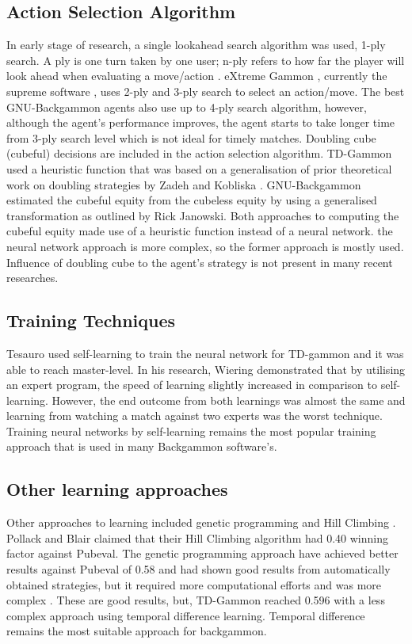\documentclass[12pt,a4paper]{article}
\begin{document}
\subsection{Action Selection Algorithm}
In early stage of research, a single lookahead search algorithm was used, 1-ply search. A ply is one turn taken by one user; n-ply refers to how far the player will look ahead when evaluating a move/action \cite{glossary}. eXtreme Gammon \citeyear{exg}, currently the supreme software \cite{botbattle}, uses 2-ply and 3-ply search to select an action/move. The best GNU-Backgammon \cite{gnubg} agents also use up to 4-ply search algorithm, however, although the agent's performance improves, the agent starts to take longer time from 3-ply search level which is not ideal for timely matches. Doubling cube (cubeful) decisions are included in the action selection algorithm. TD-Gammon used a heuristic function that was based on a generalisation of prior theoretical work on doubling strategies by Zadeh and Kobliska \cite{DBLP:journals/ai/Tesauro02}. GNU-Backgammon estimated the cubeful equity from the cubeless equity by using a generalised transformation as outlined by Rick Janowski. Both approaches to computing the cubeful equity made use of a heuristic function instead of a neural network.  the neural network approach is more complex, so the former approach is mostly used. Influence of doubling cube to the agent's strategy is not present in many recent researches. 

\subsection{Training Techniques}
Tesauro \citeyear{DBLP:conf/icml/Tesauro92} used self-learning to train the neural network for TD-gammon and it was able to reach master-level. In his research, Wiering \citeyear{DBLP:journals/jilsa/Wiering10} demonstrated that by utilising an expert program, the speed of learning slightly increased in comparison to self-learning. However, the end outcome from both learnings was almost the same and learning from watching a match against two experts was the worst technique. Training neural networks by self-learning remains the most popular training approach that is used in many Backgammon software’s.

\subsection{Other learning approaches}
Other approaches to learning included genetic programming \cite{DBLP:journals/gpem/AzariaS05} and Hill Climbing \cite{DBLP:journals/ml/PollackB98}. Pollack and Blair claimed that their Hill Climbing algorithm had 0.40 winning factor against Pubeval. The genetic programming approach have achieved better results against Pubeval of 0.58 and had shown good results from automatically obtained strategies, but it required more computational efforts and was more complex \cite{DBLP:journals/gpem/AzariaS05}. These are good results, but, TD-Gammon reached 0.596 with a less complex approach using temporal difference learning. Temporal difference remains the most suitable approach for backgammon.
\end{document}
